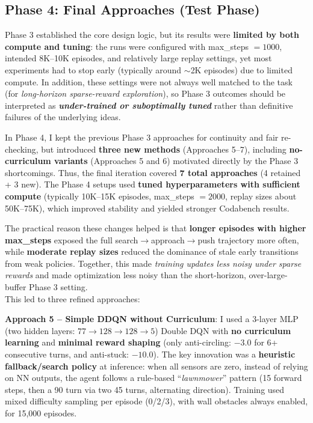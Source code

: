 \documentclass[10.5pt, oneside]{article}
\begin{document}
\subsection{Phase 4: Final Approaches (Test Phase)}

Phase 3 established the core design logic, but its results were \textbf{limited by both compute and tuning}: the runs were configured with max\_steps $=1000$, intended 8K--10K episodes, and relatively large replay settings, yet most experiments had to stop early (typically around \(\sim\)2K episodes) due to limited compute. In addition, these settings were not always well matched to the task (for \textit{long-horizon sparse-reward exploration}), so Phase 3 outcomes should be interpreted as \textbf{\textit{under-trained or suboptimally tuned}} rather than definitive failures of the underlying ideas.

In Phase 4, I kept the previous Phase 3 approaches for continuity and fair re-checking, but introduced \textbf{three new methods} (Approaches 5--7), including \textbf{no-curriculum variants} (Approaches 5 and 6) motivated directly by the Phase 3 shortcomings. Thus, the final iteration covered \textbf{7 total approaches} (4 retained + 3 new). The Phase 4 setups used \textbf{tuned hyperparameters with sufficient compute} (typically 10K--15K episodes, max\_steps $=2000$, replay sizes about 50K--75K), which improved stability and yielded stronger Codabench results.

The practical reason these changes helped is that \textbf{longer episodes with higher max\_steps} exposed the full search$\rightarrow$approach$\rightarrow$push trajectory more often, while \textbf{moderate replay sizes} reduced the dominance of stale early transitions from weak policies. Together, this made \textit{training updates less noisy under sparse rewards} and made optimization less noisy than the short-horizon, over-large-buffer Phase 3 setting.\\
\noindent This led to three refined approaches:


\textbf{Approach 5 -- Simple DDQN without Curriculum}: I used a 3-layer MLP (two hidden layers: $77 \to 128 \to 128 \to 5$) Double DQN with \textbf{no curriculum learning} and \textbf{minimal reward shaping} (only anti-circling: $-3.0$ for 6+ consecutive turns, and anti-stuck: $-10.0$). The key innovation was a \textbf{heuristic fallback/search policy} at inference: when all sensors are zero, instead of relying on NN outputs, the agent follows a rule-based ``\textit{lawnmower}'' pattern (15 forward steps, then a 90\textdegree{} turn via two 45\textdegree{} turns, alternating direction). Training used mixed difficulty sampling per episode (0/2/3), with wall obstacles always enabled, for 15,000 episodes.
\end{document}
